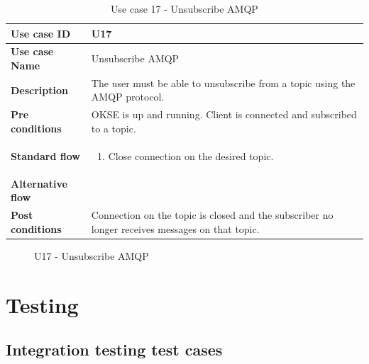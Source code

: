 \begin{table}[ht!]
\centering
\begin{tabular}{|l|p{5cm}|}
\hline
\textbf{Use case ID} & U17\\ \hline
\textbf{Use case Name} & Unsubscribe AMQP\\ \hline
\textbf{Description} & The user must be able to unsubscribe from a topic using the AMQP protocol.\\ \hline
\textbf{Pre conditions} & OKSE is up and running. Client is connected and subscribed to a topic.\\ \hline
\textbf{Standard flow} & \begin{enumerate}
\item Close connection on the desired topic.
\end{enumerate} \\ \hline
\textbf{Alternative flow} & \\ \hline
\textbf{Post conditions} & Connection on the topic is closed and the subscriber no longer receives messages on that topic.  \\ \hline
\end{tabular}
\caption{Use case 17 - Unsubscribe AMQP}
\label{uc17}
\end{table}

\begin{center}
  \begin{figure}[ht!]
    \caption{U17 - Unsubscribe AMQP}
    \label{fig:u17}
  \end{figure}
\end{center}

\clearpage

\section{Testing}
\label{sec:appendix-testing}

\subsection{Integration testing test cases}

